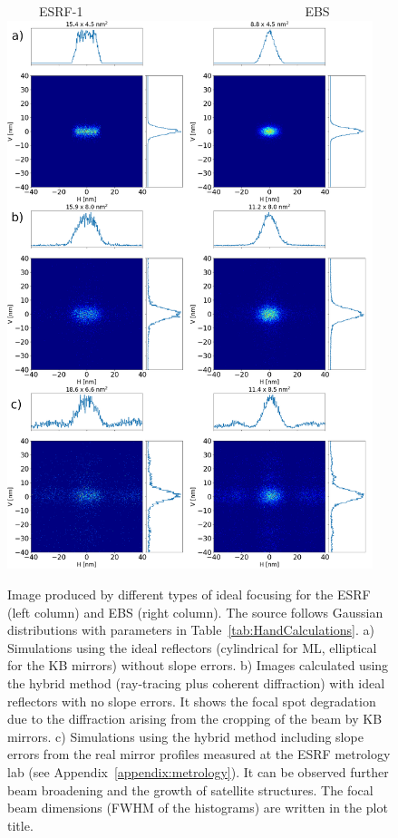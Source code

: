 \documentclass{iucr}              %
\begin{document}
\begin{figure}
\label{fig:ray-tracing}
\centering
~~~~~ESRF-1~~~~~~~~~~~~~~~~~~~~~~~~~~~~~~~~~~~EBS
\newline
\includegraphics[width=0.95\textwidth]{GRAPHICS/figure3.png}
\caption{Image produced by different types of ideal focusing for the ESRF (left column) and EBS (right column). The source follows Gaussian distributions with parameters in Table~\ref{tab:HandCalculations}. 
a) Simulations using the ideal reflectors (cylindrical for ML, elliptical for the KB mirrors) without slope errors. 
b) Images calculated using the hybrid method (ray-tracing plus coherent diffraction) with ideal reflectors with no slope errors. It shows the focal spot degradation due to the diffraction arising from the cropping of the beam by KB mirrors. c) Simulations using the hybrid method including slope errors from the real mirror profiles measured at the ESRF metrology lab (see Appendix~\ref{appendix:metrology}). It can be observed further beam broadening and the growth of satellite structures. 
The focal beam dimensions (FWHM of the histograms) are written in the plot title.
}
\end{figure}
\end{document}
